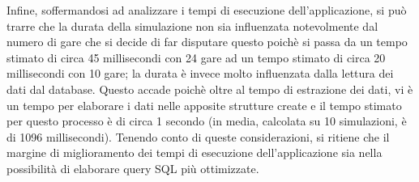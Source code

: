 Infine, soffermandosi ad analizzare i tempi di esecuzione dell'applicazione, si può trarre che la durata della simulazione non sia influenzata notevolmente dal numero di gare che si decide di far disputare questo poichè si passa da un tempo stimato di circa 45 millisecondi con 24 gare ad un tempo stimato di circa 20 millisecondi con 10 gare; la durata è invece molto influenzata dalla lettura dei dati dal database. Questo accade poichè oltre al tempo di estrazione dei dati, vi è un tempo per elaborare i dati nelle apposite strutture create e il tempo stimato per questo processo è di circa 1 secondo (in media, calcolata su 10 simulazioni, è di 1096 millisecondi). Tenendo conto di queste considerazioni, si ritiene che il margine di miglioramento dei tempi di esecuzione dell'applicazione sia nella possibilità di elaborare query SQL più ottimizzate.